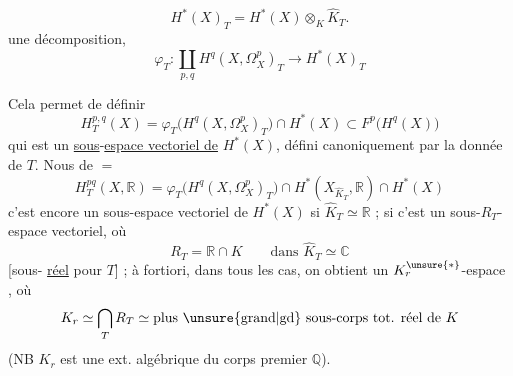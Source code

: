 \[
H^*(X)_T=H^*(X)\otimes_K\widehat K_T.
\]
une décomposition,
\[
\boxed{\varphi_T:\coprod_{p,q}H^q(X,\Omega_X^p)_T\longrightarrow H^*(X)_T}
\]

Cela permet de définir
\[
H_T^{p,q}(X)=\varphi_T\big(H^q(X,\Omega_X^p)_T\big)\cap H^*(X)
 \subset F^p\big(H^q(X)\big)
\]
qui est un \uline{sous}-\uline{espace vectoriel de} $H^*(X)$,
défini canoniquement par la donnée de $T$. Nous
 de $=$
\[
H_T^{pq}(X,\mathbb R)=\varphi_T\big(H^q(X,\Omega_X^p)_T\big)
\cap H^*(X_{\widehat K_T},\mathbb R)\cap H^*(X)
\]
c'est encore un sous-espace vectoriel de $H^*(X)$
si $\widehat K_T\simeq\mathbb R$ ; si  c'est un sous-$R_T$-espace vectoriel, où
\[
R_T=\mathbb R\cap K\qquad\text{dans }\widehat K_T\simeq\mathbb C
\]
[sous- \uline{réel} pour $T$] ; à fortiori,  dans tous les
cas, on obtient un $K_r^{\unsure{*}}$-espace , où
\[
K_r\simeq\bigcap_T R_T\simeq\text{plus \unsure{grand|gd} sous-corps tot. réel de }K
\]
(NB $K_r$ est une ext. algébrique du corps premier $\mathbb Q$).
